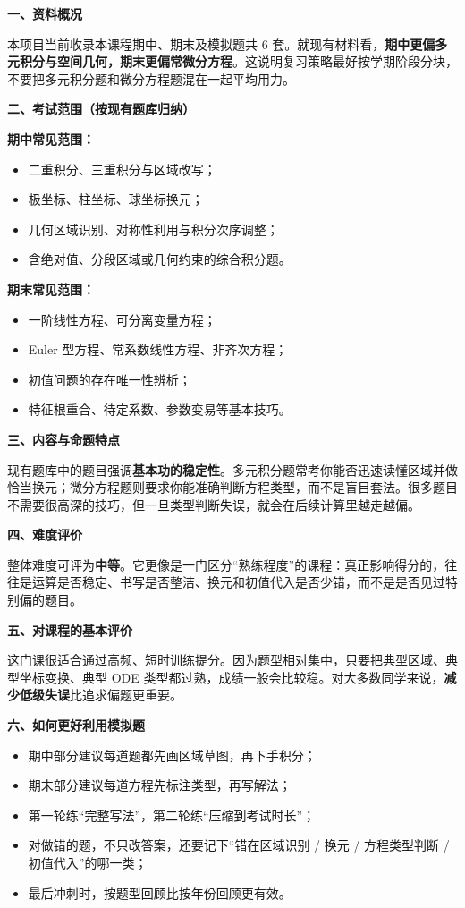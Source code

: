 ﻿

\textbf{一、资料概况}

本项目当前收录本课程期中、期末及模拟题共 6 套。就现有材料看，\textbf{期中更偏多元积分与空间几何，期末更偏常微分方程}。这说明复习策略最好按学期阶段分块，不要把多元积分题和微分方程题混在一起平均用力。

\textbf{二、考试范围（按现有题库归纳）}

\textbf{期中常见范围：}
\begin{itemize}[leftmargin=2em,itemsep=0.2em,topsep=0.2em]
  \item 二重积分、三重积分与区域改写；
  \item 极坐标、柱坐标、球坐标换元；
  \item 几何区域识别、对称性利用与积分次序调整；
  \item 含绝对值、分段区域或几何约束的综合积分题。
\end{itemize}

\textbf{期末常见范围：}
\begin{itemize}[leftmargin=2em,itemsep=0.2em,topsep=0.2em]
  \item 一阶线性方程、可分离变量方程；
  \item Euler 型方程、常系数线性方程、非齐次方程；
  \item 初值问题的存在唯一性辨析；
  \item 特征根重合、待定系数、参数变易等基本技巧。
\end{itemize}

\textbf{三、内容与命题特点}

现有题库中的题目强调\textbf{基本功的稳定性}。多元积分题常考你能否迅速读懂区域并做恰当换元；微分方程题则要求你能准确判断方程类型，而不是盲目套法。很多题目不需要很高深的技巧，但一旦类型判断失误，就会在后续计算里越走越偏。

\textbf{四、难度评价}

整体难度可评为\textbf{中等}。它更像是一门区分“熟练程度”的课程：真正影响得分的，往往是运算是否稳定、书写是否整洁、换元和初值代入是否少错，而不是是否见过特别偏的题目。

\textbf{五、对课程的基本评价}

这门课很适合通过高频、短时训练提分。因为题型相对集中，只要把典型区域、典型坐标变换、典型 ODE 类型都过熟，成绩一般会比较稳。对大多数同学来说，\textbf{减少低级失误}比追求偏题更重要。

\textbf{六、如何更好利用模拟题}
\begin{itemize}[leftmargin=2em,itemsep=0.2em,topsep=0.2em]
  \item 期中部分建议每道题都先画区域草图，再下手积分；
  \item 期末部分建议每道方程先标注类型，再写解法；
  \item 第一轮练“完整写法”，第二轮练“压缩到考试时长”；
  \item 对做错的题，不只改答案，还要记下“错在区域识别 / 换元 / 方程类型判断 / 初值代入”的哪一类；
  \item 最后冲刺时，按题型回顾比按年份回顾更有效。
\end{itemize}

